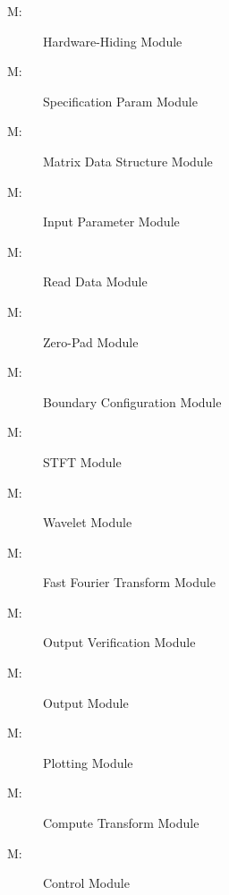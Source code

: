 \documentclass[12pt, titlepage]{article}
\newcounter{mnum}
\newcommand{\mthemnum}{M\themnum}
\begin{document}
\begin{description}
\item [ \mthemnum \label{mHH}:] Hardware-Hiding Module
\item [ \mthemnum \label{mSpecParam}:] Specification Param Module
\item [ \mthemnum \label{mMatrix}:] Matrix Data Structure Module
\item [ \mthemnum \label{mInputParam}:] Input Parameter Module 
\item [ \mthemnum \label{mReadData}:] Read Data Module
\item [ \mthemnum \label{mZeroPad}:] Zero-Pad Module
\item [ \mthemnum \label{mBoundry}:] Boundary Configuration Module
\item [ \mthemnum \label{mSTFT}:] STFT Module
\item [ \mthemnum \label{mWavelet}:] Wavelet Module
\item [ \mthemnum \label{mFFT}:] Fast Fourier Transform Module 
\item [ \mthemnum \label{mOutputVerify}:] Output Verification Module
\item [ \mthemnum \label{mOutput}:] Output Module
\item [ \mthemnum \label{mPlot}:] Plotting Module
\item [ \mthemnum \label{mTransform}:] Compute Transform Module  \item [ \mthemnum \label{mControl}:] Control Module
\end{description}
\end{document}
